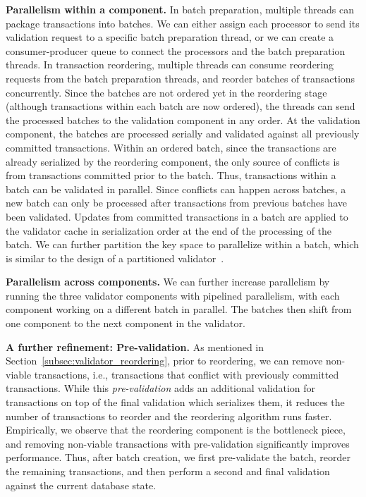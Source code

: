 {\bf Parallelism within a component.}
In batch preparation, multiple threads can package transactions into batches. We can either assign each processor to send its validation request to a specific batch preparation thread, or we can create a consumer-producer queue to connect the processors and the batch preparation threads. In transaction reordering, multiple threads can consume reordering requests from the batch preparation threads, and reorder batches of transactions concurrently. Since the batches are not ordered yet in the reordering stage (although transactions within each batch are now ordered), the threads can send the processed batches to the validation component in any order. At the validation component, the batches are processed serially and validated against all previously committed transactions. 
Within an ordered batch, since the transactions are already serialized by the reordering component, the only source of conflicts is from  transactions committed prior to the batch. Thus, transactions within a batch can be validated in parallel. Since conflicts can happen across batches, a new batch can only be processed after transactions from previous batches have been validated. Updates from committed transactions in a batch are applied to the validator cache in serialization order at the end of the processing of the batch. We can further partition the key space to parallelize within a batch, which is similar to the design of a partitioned validator~\cite{ding2015centiman}.


{\bf Parallelism across components.}
We can further increase parallelism by running the three validator components with pipelined parallelism, 
with each component working on a different batch in parallel. The batches then shift from one component to the next component in the validator.

{\bf A further refinement: Pre-validation.} As mentioned in Section~\ref{subsec:validator_reordering}, prior to reordering, we can remove non-viable transactions, i.e., transactions that conflict with previously committed transactions. While this \emph{pre-validation} adds an additional validation for transactions on top of the final validation which serializes them, it reduces the number of transactions to reorder and the reordering algorithm runs faster. Empirically, we observe that the reordering component is the bottleneck piece, and removing non-viable transactions with pre-validation significantly improves performance. Thus, after batch creation, we first pre-validate the batch, reorder the remaining transactions, and then perform a second and final validation against the current database state.

